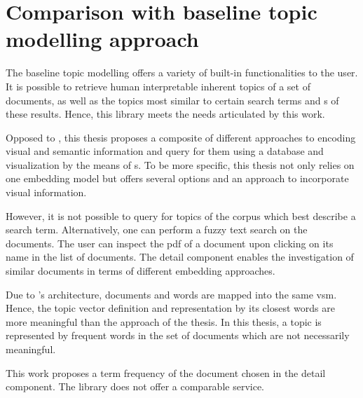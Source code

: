 \section{Comparison with baseline topic modelling approach}\label{sec:evaluation-top-model-app}

The baseline topic modelling \topTwovec{} offers a variety of built-in functionalities to the user.
It is possible to retrieve human interpretable inherent topics of a set of documents, 
as well as the topics most similar to certain search terms 
and \wordcloud{}s of these results.
Hence, this library meets the needs articulated by this work.

Opposed to \topTwovec{}, this thesis proposes a composite of different approaches to encoding visual and semantic information 
and query for them using a database and visualization by the means of \wordcloud{}s.
To be more specific, this thesis not only relies on one embedding model but offers several options and an approach to incorporate visual information.

However, it is not possible to query for topics of the corpus which best describe a search term.
Alternatively, one can perform a fuzzy text search on the documents.
The user can inspect the \ac{pdf} of a document upon clicking on its name in the list of documents.
The detail component enables the investigation of similar documents in terms of different embedding approaches.

Due to \topTwovec{}'s architecture, documents and words are mapped into the same \ac{vsm}.
Hence, the topic vector definition and representation by its closest words are more meaningful than the approach of the thesis. 
In this thesis, a topic is represented by frequent words in the set of documents which are not necessarily meaningful. 

This work proposes a term frequency of the document chosen in the detail component.
The \topTwovec{} library does not offer a comparable service.